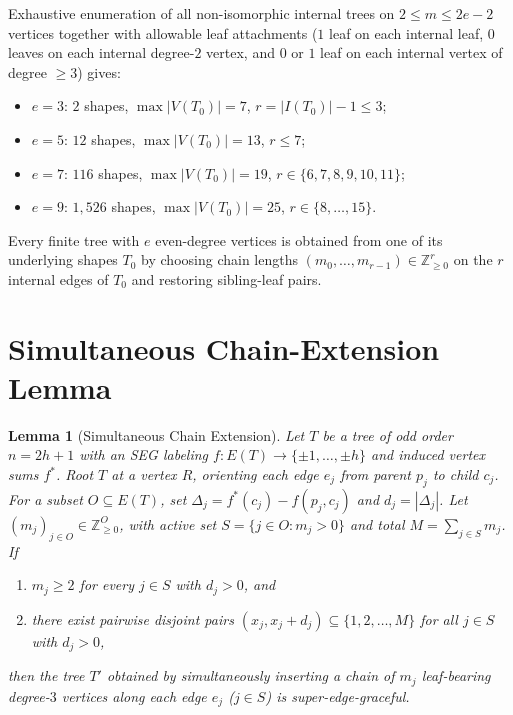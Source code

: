 \documentclass[11pt]{article}
\newtheorem{lemma}[theorem]{Lemma}
\theoremstyle{definition}
\begin{document}
Exhaustive enumeration of all non-isomorphic internal trees on $2 \le m \le 2e - 2$ vertices together with allowable leaf attachments ($1$ leaf on each internal leaf, $0$ leaves on each internal degree-$2$ vertex, and $0$ or $1$ leaf on each internal vertex of degree $\ge 3$) gives:
\begin{itemize}
\item $e = 3$: $2$ shapes, $\max |V(T_0)| = 7$, $r = |I(T_0)| - 1 \le 3$;
\item $e = 5$: $12$ shapes, $\max |V(T_0)| = 13$, $r \le 7$;
\item $e = 7$: $116$ shapes, $\max |V(T_0)| = 19$, $r \in \{6, 7, 8, 9, 10, 11\}$;
\item $e = 9$: $1{,}526$ shapes, $\max |V(T_0)| = 25$, $r \in \{8, \dots, 15\}$.
\end{itemize}
Every finite tree with $e$ even-degree vertices is obtained from one of its underlying shapes $T_0$ by choosing chain lengths $(m_0, \dots, m_{r-1}) \in \mathbb{Z}_{\ge 0}^r$ on the $r$ internal edges of $T_0$ and restoring sibling-leaf pairs.

\section{Simultaneous Chain-Extension Lemma}

\begin{lemma}[Simultaneous Chain Extension]\label{lem:ext}
Let $T$ be a tree of odd order $n = 2h + 1$ with an SEG labeling $f : E(T) \to \{\pm 1, \dots, \pm h\}$ and induced vertex sums $f^*$. Root $T$ at a vertex $R$, orienting each edge $e_j$ from parent $p_j$ to child $c_j$. For a subset $O \subseteq E(T)$, set $\Delta_j = f^*(c_j) - f(p_j, c_j)$ and $d_j = |\Delta_j|$. Let $(m_j)_{j \in O} \in \mathbb{Z}_{\ge 0}^O$, with active set $S = \{j \in O : m_j > 0\}$ and total $M = \sum_{j \in S} m_j$. If
\begin{enumerate}
\item $m_j \ge 2$ for every $j \in S$ with $d_j > 0$, and
\item there exist pairwise disjoint pairs $(x_j, x_j + d_j) \subseteq \{1, 2, \dots, M\}$ for all $j \in S$ with $d_j > 0$,
\end{enumerate}
then the tree $T'$ obtained by simultaneously inserting a chain of $m_j$ leaf-bearing degree-$3$ vertices along each edge $e_j$ ($j \in S$) is super-edge-graceful.
\end{lemma}
\end{document}
